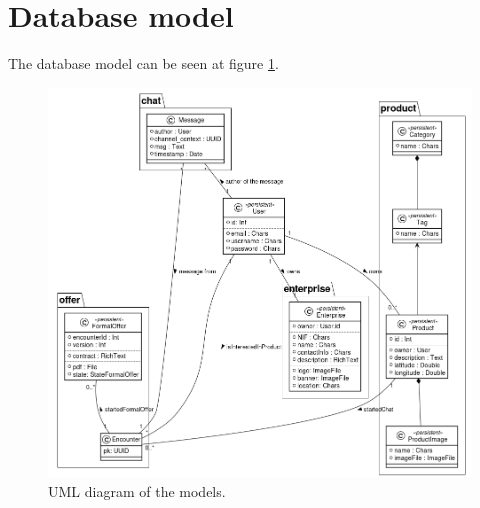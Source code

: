 \documentclass[./main.tex]{subfiles}
\begin{document}



\section{Database model}
The database model can be seen at figure \ref{fig:model-uml}.
\begin{figure}[H]
\centering
\includegraphics[width=\linewidth]{img/database-model-new.png}
\caption{UML diagram of the models.}
\label{fig:model-uml}
\end{figure}
\end{document}
